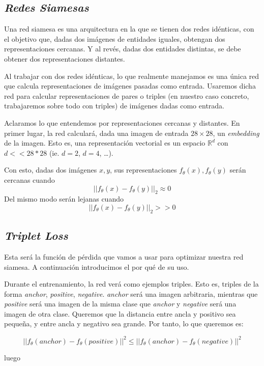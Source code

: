 \documentclass[11pt]{article}
\begin{document}
\subsection {\emph{Redes Siamesas}}

Una red siamesa es una arquitectura en la que se tienen dos redes idénticas, con el objetivo que, dadas dos imágenes de entidades iguales, obtengan dos representaciones cercanas. Y al revés, dadas dos entidades distintas, se debe obtener dos representaciones distantes.

Al trabajar con dos redes idénticas, lo que realmente manejamos es una única red que calcula representaciones de imágenes pasadas como entrada. Usaremos dicha red para calcular representaciones de pares o triples (en nuestro caso concreto, trabajaremos sobre todo con triples) de imágenes dadas como entrada.

Aclaramos lo que entendemos por representaciones cercanas y distantes. En primer lugar, la red calculará, dada una imagen de entrada $28\times28$, un \emph{embedding} de la imagen. Esto es, una representación vectorial es un espacio $\mathbb{R}^d$ con $d << 28*28$ (ie. $d = 2$, $d = 4$, \ldots).

Con esto, dadas dos imágenes $x, y$, sus representaciones $ f_{\theta}(x),  f_{\theta}(y)$ serán cercanas cuando $$|| f_{\theta}(x) - f_{\theta}(y)||_2 \approx 0$$ Del mismo modo serán lejanas cuando $$|| f_{\theta}(x) - f_{\theta}(y)||_2 >> 0$$

\pagebreak
\subsection{\emph{Triplet Loss}}

Esta será la función de pérdida que vamos a usar para optimizar nuestra red siamesa. A continuación introducimos el por qué de su uso.

Durante el entrenamiento, la red verá como ejemplos triples. Esto es, triples de la forma \emph{anchor}, \emph{positive}, \emph{negative}. \emph{anchor} será una imagen arbitraria, mientras que \emph{positive} será una imagen de la misma clase que \emph{anchor} y \emph{negative} será una imagen de otra clase. Queremos que la distancia entre ancla y positivo sea pequeña, y entre ancla y negativo sea grande. Por tanto, lo que queremos es:

$$||f_{\theta}(anchor) - f_{\theta}(positive)||^2 \leq ||f_{\theta}(anchor) - f_{\theta}(negative)||^2 $$

luego
\end{document}
